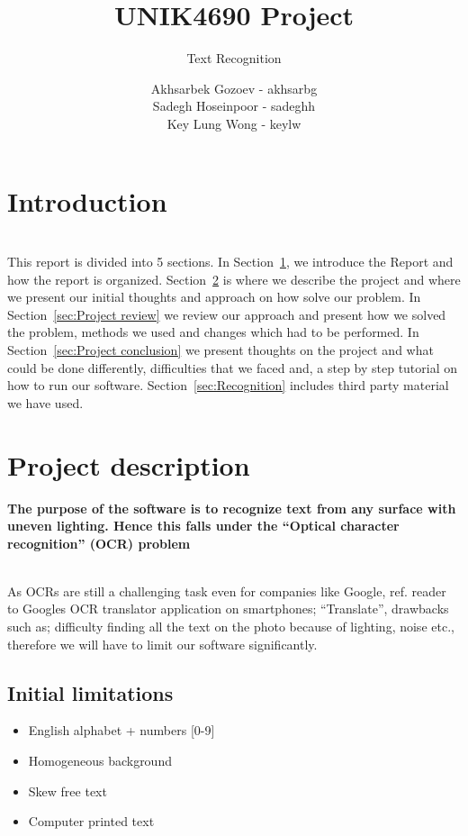 \documentclass[11pt,a4paper,UKenglish]{article}
\title{UNIK4690 Project}
\subtitle{Text Recognition}
\author{
  Akhsarbek Gozoev  - akhsarbg \\
  Sadegh Hoseinpoor - sadeghh\\
  Key Lung Wong - keylw
}
\begin{document}
\ififorside[kind={Report}]

\newpage
\tableofcontents
\newpage
\section{Introduction}
\label{sec:Introduction}
\noindent \\ This report is divided into 5 sections. In Section~\ref{sec:Introduction}, we introduce the
Report and how the report is organized. Section~\ref{sec:Project description} is
where we describe the project and where we present our initial thoughts and
approach on how solve our problem. In Section~\ref{sec:Project review} we
review our approach and present how we solved the problem, methods we used and
changes which had to be performed. In Section~\ref{sec:Project conclusion} we
present thoughts on the project and what could be done differently,
difficulties that we faced and, a step by step tutorial on how to run our
software. Section~\ref{sec:Recognition} includes third party material we have used.


\newpage

\section{Project description}
\label{sec:Project description}
\textbf{The purpose of the software is to recognize text from any
surface with uneven lighting. Hence this falls under the ``Optical
character recognition'' (OCR) problem}

\noindent \\ As OCRs are still a challenging task even for companies like
Google, ref. reader to Googles OCR translator application on smartphones;
``Translate'', drawbacks such as; difficulty finding all the text on the photo
because of lighting, noise etc., therefore we will have to limit our software
significantly.

\subsection{Initial limitations}
\begin{itemize}
 \item{English alphabet + numbers [0-9]}
 \item{Homogeneous background}
 \item{Skew free text}
 \item{Computer printed text}
\end{itemize}
\end{document}
